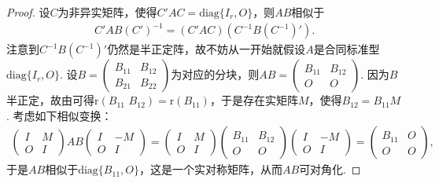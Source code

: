\documentclass[../../main.tex]{subfiles}%
\begin{document}
\begin{proof}

设\(C\)为非异实矩阵，使得\(C'AC = \mathrm{diag}\{I_r,O\}\)，则\(AB\)相似于
\begin{align*}
C'AB(C')^{-1}=(C'AC)(C^{-1}B(C^{-1})').
\end{align*}
注意到\(C^{-1}B(C^{-1})'\)仍然是半正定阵，故不妨从一开始就假设\(A\)是合同标准型\(\mathrm{diag}\{I_r,O\}\). 设\(B=\begin{pmatrix}B_{11}&B_{12}\\B_{21}&B_{22}\end{pmatrix}\)为对应的分块，则\(AB=\begin{pmatrix}B_{11}&B_{12}\\O&O\end{pmatrix}\). 因为\(B\)半正定，故由可得\(\mathrm{r}(B_{11}\,\,B_{12})=\mathrm{r}(B_{11})\)，于是存在实矩阵\(M\)，使得\(B_{12}=B_{11}M\). 考虑如下相似变换：
\begin{align*}
\begin{pmatrix}I&M\\O&I\end{pmatrix}AB\begin{pmatrix}I&-M\\O&I\end{pmatrix}=\begin{pmatrix}I&M\\O&I\end{pmatrix}\begin{pmatrix}B_{11}&B_{12}\\O&O\end{pmatrix}\begin{pmatrix}I&-M\\O&I\end{pmatrix}=\begin{pmatrix}B_{11}&O\\O&O\end{pmatrix},
\end{align*}
于是\(AB\)相似于\(\mathrm{diag}\{B_{11},O\}\)，这是一个实对称矩阵，从而\(AB\)可对角化.

\end{proof}
\end{document}
